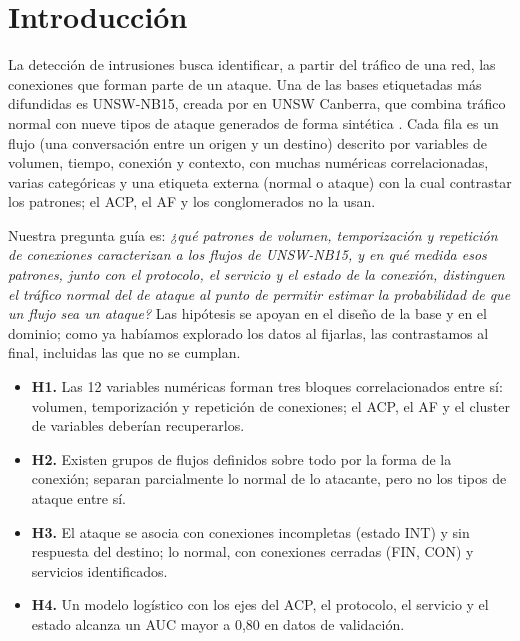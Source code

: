 \section{Introducción}
\label{sec:introduccion}

La detección de intrusiones busca identificar, a partir del tráfico de una red, las conexiones que forman parte de un ataque. Una de las bases etiquetadas más difundidas es UNSW-NB15, creada por \citet{moustafa2015} en UNSW Canberra, que combina tráfico normal con nueve tipos de ataque generados de forma sintética \citep{moustafa2016}. Cada fila es un flujo (una conversación entre un origen y un destino) descrito por variables de volumen, tiempo, conexión y contexto, con muchas numéricas correlacionadas, varias categóricas y una etiqueta externa (normal o ataque) con la cual contrastar los patrones; el ACP, el AF y los conglomerados no la usan.

Nuestra pregunta guía es: \emph{¿qué patrones de volumen, temporización y repetición de conexiones caracterizan a los flujos de UNSW-NB15, y en qué medida esos patrones, junto con el protocolo, el servicio y el estado de la conexión, distinguen el tráfico normal del de ataque al punto de permitir estimar la probabilidad de que un flujo sea un ataque?} Las hipótesis se apoyan en el diseño de la base y en el dominio; como ya habíamos explorado los datos al fijarlas, las contrastamos al final, incluidas las que no se cumplan.

\begin{itemize}\setlength{\itemsep}{0pt}\setlength{\topsep}{2pt}
  \item \textbf{H1.} Las 12 variables numéricas forman tres bloques correlacionados entre sí: volumen, temporización y repetición de conexiones; el ACP, el AF y el cluster de variables deberían recuperarlos.
  \item \textbf{H2.} Existen grupos de flujos definidos sobre todo por la forma de la conexión; separan parcialmente lo normal de lo atacante, pero no los tipos de ataque entre sí.
  \item \textbf{H3.} El ataque se asocia con conexiones incompletas (estado INT) y sin respuesta del destino; lo normal, con conexiones cerradas (FIN, CON) y servicios identificados.
  \item \textbf{H4.} Un modelo logístico con los ejes del ACP, el protocolo, el servicio y el estado alcanza un AUC mayor a 0,80 en datos de validación.
\end{itemize}
